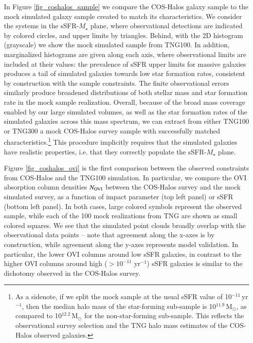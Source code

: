 \documentclass[useAMS,usenatbib]{mnras}
\newcommand{\msun}{\,M$_{\odot}$\xspace}
\newcommand{\ovi}{OVI\xspace}
\begin{document}
In Figure \ref{fig_coshalos_sample} we compare the COS-Halos galaxy sample to the mock simulated galaxy sample created to match its characteristics. We consider the systems in the sSFR-$M_\star$ plane, where observational detections are indicated by colored circles, and upper limits by triangles. Behind, with the 2D histogram (grayscale) we show the mock simulated sample from TNG100. In addition, marginalized histograms are given along each axis, where observational limits are included at their values: the prevalence of sSFR upper limits for massive galaxies produces a tail of simulated galaxies towards low star formation rates, consistent by construction with the sample constraints. The finite observational errors similarly produce broadened distributions of both stellar mass and star formation rate in the mock sample realization. Overall, because of the broad mass coverage enabled by our large simulated volumes, as well as the star formation rates of the simulated galaxies across this mass spectrum, we can extract from either TNG100 or TNG300 a mock COS-Halos survey sample with successfully matched characteristics.\footnote{As a sidenote, if we split the mock sample at the usual sSFR value of 10$^{-11}$\,yr$^{-1}$, then the median halo mass of the star-forming sub-sample is 10$^{11.9}$\msun, as compared to 10$^{12.2}$\msun for the non-star-forming sub-sample. This reflects the observational survey selection and the TNG halo mass estimates of the COS-Halos observed galaxies.} This procedure implicitly requires that the simulated galaxies have realistic properties, i.e. that they correctly populate the sSFR-$M_\star$ plane.

Figure \ref{fig_coshalos_ovi} is the first comparison between the observed constraints from COS-Halos and the TNG100 simulation. In particular, we compare the \ovi absorption column densities $N_{\rm OVI}$ between the COS-Halos survey and the mock simulated survey, as a function of impact parameter (top left panel) or sSFR (bottom left panel). In both cases, large colored symbols represent the observed sample, while each of the 100 mock realizations from TNG are shown as small colored squares. We see that the simulated point clouds broadly overlap with the observational data points -- note that agreement along the x-axes is by construction, while agreement along the y-axes represents model validation. In particular, the lower \ovi columns around low sSFR galaxies, in contrast to the higher \ovi columns around high ($> 10^{-11}$ yr$^{-1}$) sSFR galaxies is similar to the dichotomy observed in the COS-Halos survey.
\end{document}
